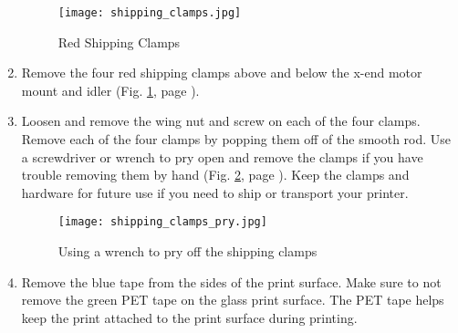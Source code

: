 \begin{enumerate}
\begin{figure}[hbt]
\centering
\texttt{[image: shipping\_clamps.jpg]}
\caption{Red Shipping Clamps}
\label{fig:shipping_clamps}
\end{figure}

\item Remove the four red shipping clamps above and below the x-end motor mount and idler
(Fig. \ref{fig:shipping_clamps}, page \pageref{fig:shipping_clamps}).

\item Loosen and remove the wing nut and screw on each of the four clamps. Remove each of the four clamps by popping them off of the smooth rod. Use a screwdriver or wrench to pry open and remove the clamps if you have trouble removing them by hand (Fig. \ref{fig:shipping_clamps_pry}, page \pageref{fig:shipping_clamps_pry}). Keep the clamps and hardware for future use if you need to ship or transport your printer.

\begin{figure}[hbt]
\centering
\texttt{[image: shipping\_clamps\_pry.jpg]}
\caption{Using a wrench to pry off the shipping clamps}
\label{fig:shipping_clamps_pry}
\end{figure}

\item Remove the blue tape from the sides of the print surface. Make sure to not remove the green PET tape on the glass print surface. The PET tape helps keep the print attached to the print surface during printing.

\end{enumerate}
